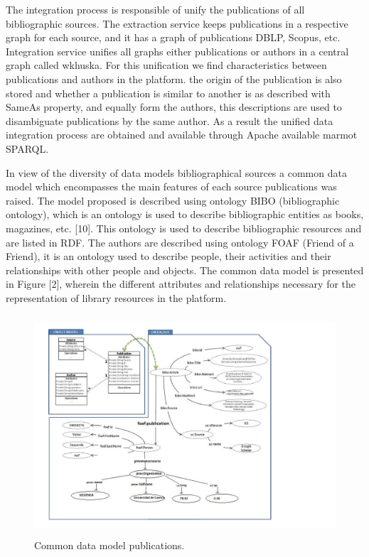 \documentclass[11pt]{article}
\begin{document}
The integration process is responsible of unify the publications of all bibliographic sources. The extraction service keeps publications in a respective graph for each source, and it has a graph of publications DBLP, Scopus, etc. Integration service unifies all graphs either publications or authors in a central graph called wkhuska. For this unification we find characteristics between publications and authors in the platform. the origin of the publication is also stored and whether a publication is similar to another is as described with  SameAs  property, and equally form  the authors, this descriptions are used to disambiguate publications by the same author. As a result the unified data integration process are obtained and available through Apache available marmot SPARQL.
 

In view of the diversity of data models bibliographical sources a common data model which encompasses the main features of each source publications was raised. The model proposed is described using ontology BIBO (bibliographic ontology), which is an ontology is used to describe bibliographic entities as books, magazines, etc. [10]. This ontology is used to describe bibliographic resources and are listed in RDF. The authors are described using ontology FOAF (Friend of a Friend), it is an ontology used to describe people, their activities and their relationships with other people and objects. The common data model is presented in Figure [2], wherein the different attributes and relationships necessary for the representation of library resources in the platform.

 \begin{figure}[ht!]
	\centering
		\includegraphics[height=8.2cm]{dataModelCommon.png}
	\caption{Common data model publications.}
	\label{fig:Escudo2}
\end{figure}
 
\end{document}
